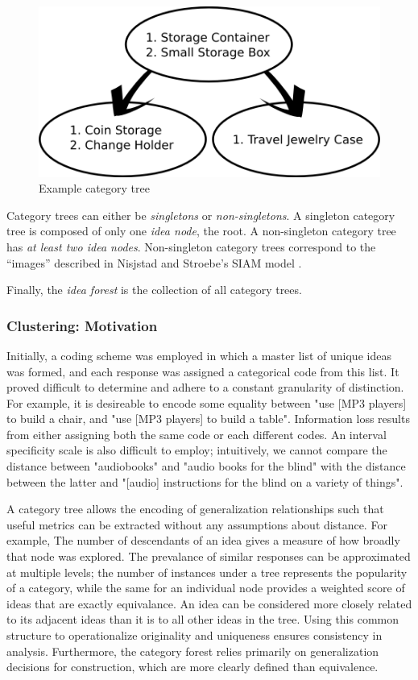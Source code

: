 \begin{figure}[!h]
    \centering
    \includegraphics[width=0.9\columnwidth]{example_instances}
    \caption{Example category tree}
    \label{fig:example_instances}
\end{figure}

Category trees can either be \emph{singletons} or \emph{non-singletons}. A singleton category tree is composed of only one \emph{idea node}, the root. A non-singleton category tree has \emph{at least two idea nodes}. Non-singleton category trees correspond to the ``images'' described in Nisjstad and Stroebe's SIAM model \cite{nijstad_how_2006}.

Finally, the \emph{idea forest} is the collection of all category trees.

\subsubsection{Clustering: Motivation}

Initially, a coding scheme was employed in which a master list of unique ideas was formed, and each response was assigned a categorical code from this list. It proved difficult to determine and adhere to a constant granularity of distinction. For example, it is desireable to encode some equality between "use [MP3 players] to build a chair, and "use [MP3 players] to build a table". Information loss results from either assigning both the same code or each different codes. An interval specificity scale is also difficult to employ; intuitively, we cannot compare the distance between "audiobooks" and "audio books for the blind" with the distance between the latter and "[audio] instructions for the blind on a variety of things".

A category tree allows the encoding of generalization relationships such that useful metrics can be extracted without any assumptions about distance.
For example, The number of descendants of an idea gives a measure of how broadly that node was explored. 
The prevalance of similar responses can be approximated at multiple levels; the number of instances under a tree represents the popularity of a category, while the same for an individual node provides a weighted score of ideas that are exactly equivalance.
An idea can be considered more closely related to its adjacent ideas than it is to all other ideas in the tree.
Using this common structure to operationalize originality and uniqueness ensures consistency in analysis. Furthermore, the category forest relies primarily on generalization decisions for construction, which are more clearly defined than equivalence.



